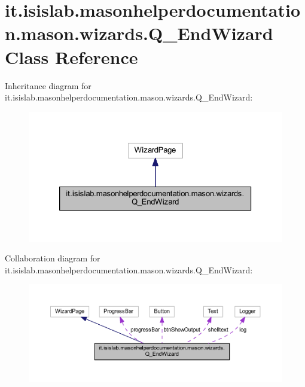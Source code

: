 \hypertarget{classit_1_1isislab_1_1masonhelperdocumentation_1_1mason_1_1wizards_1_1_q___end_wizard}{\section{it.\-isislab.\-masonhelperdocumentation.\-mason.\-wizards.\-Q\-\_\-\-End\-Wizard Class Reference}
\label{classit_1_1isislab_1_1masonhelperdocumentation_1_1mason_1_1wizards_1_1_q___end_wizard}
}


Inheritance diagram for it.\-isislab.\-masonhelperdocumentation.\-mason.\-wizards.\-Q\-\_\-\-End\-Wizard\-:\nopagebreak
\begin{figure}[H]
\begin{center}
\leavevmode
\includegraphics[width=326pt]{classit_1_1isislab_1_1masonhelperdocumentation_1_1mason_1_1wizards_1_1_q___end_wizard__inherit__graph}
\end{center}
\end{figure}


Collaboration diagram for it.\-isislab.\-masonhelperdocumentation.\-mason.\-wizards.\-Q\-\_\-\-End\-Wizard\-:\nopagebreak
\begin{figure}[H]
\begin{center}
\leavevmode
\includegraphics[width=350pt]{classit_1_1isislab_1_1masonhelperdocumentation_1_1mason_1_1wizards_1_1_q___end_wizard__coll__graph}
\end{center}
\end{figure}
